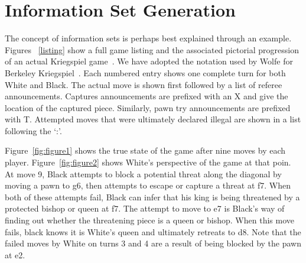\documentclass[10pt, conference, compsocconf]{IEEEtran}
\begin{document}
\section{Information Set Generation}
\label{info}
The concept of information sets is perhaps best explained through an example. 
Figures ~\ref{listing} show a full game listing and the associated pictorial progression of an actual
Kriegspiel game~\cite{li94chess}.  We have adopted the notation used by Wolfe for Berkeley Kriegspiel~\cite{wolfe07exploiting}.  Each numbered entry shows one complete turn for both White and Black.  The actual move is shown
first followed by a list of referee announcements.  Captures announcements are prefixed with an X and give the location
of the captured piece.  Similarly, pawn try announcements are prefixed with T.  Attempted moves that were ultimately
declared illegal are shown in a list following the `:'.  

Figure~\ref{fig:figure1} shows the true state of the game after nine moves by
each player.  Figure~\ref{fig:figure2} shows White's perspective of the game at
that poin. At move 9, Black attempts to block a
potential threat along the diagonal by moving a pawn to g6, then attempts to
escape or capture a threat at f7.  When both of these attempts fail, Black can
infer that his king is being threatened by a protected bishop or queen at f7.
The attempt to move to e7 is Black's way of finding out whether the threatening
piece is a queen or bishop.  When this move fails, black knows it is White's
queen and ultimately retreats to d8.  Note that the failed moves by White on
turns 3 and 4 are a result of being blocked by the pawn at e2.
\end{document}
